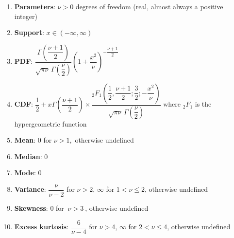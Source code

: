 \begin{enumerate}
    \item \textbf{Parameters}: ${\displaystyle \nu >0}$ degrees of freedom (real, almost always a positive integer)
    \hfill \cite{wiki/Students_t-distribution}

    \item \textbf{Support}: $  {\displaystyle x\in (-\infty ,\infty )} $
    \hfill \cite{wiki/Students_t-distribution}

    \item \textbf{PDF}: $  {\displaystyle {\dfrac {\Gamma {\left({\dfrac {\nu +1}{2}}\right)}}{{\sqrt {\pi \nu }}\,\Gamma {\left({\dfrac {\nu }{2}}\right)}}}\left(1+{\dfrac {x^{2}}{\nu }}\right)^{-{\dfrac {\nu +1}{2}}}} $
    \hfill \cite{wiki/Students_t-distribution}

    \item \textbf{CDF}:  ${\displaystyle {\dfrac {1}{2}}+x\Gamma {\left({\dfrac {\nu +1}{2}}\right)}\times {\dfrac {{}_{2}F_{1}\!\left({\dfrac {1}{2}},{\dfrac {\nu +1}{2}};{\dfrac {3}{2}};-{\dfrac {x^{2}}{\nu }}\right)}{{\sqrt {\pi \nu }}\,\Gamma {\left({\dfrac {\nu }{2}}\right)}}}}$
    where ${\displaystyle {}_{2}F_{1}}$ is the hypergeometric function
    \hfill \cite{wiki/Students_t-distribution}


    \item \textbf{Mean}:  ${\displaystyle 0}$ for ${\displaystyle \nu >1,}$ otherwise undefined
    \hfill \cite{wiki/Students_t-distribution}

    \item \textbf{Median}: $ 0 $
    \hfill \cite{wiki/Students_t-distribution}

    \item \textbf{Mode}: $ 0 $
    \hfill \cite{wiki/Students_t-distribution}

    \item \textbf{Variance}:  ${\displaystyle {\dfrac {\nu }{\nu -2}}}$ for ${\displaystyle \nu >2}$, ${\displaystyle \infty }$ for ${\displaystyle 1<\nu \leq 2}$, otherwise undefined
    \hfill \cite{wiki/Students_t-distribution}

    \item \textbf{Skewness}:  ${\displaystyle 0}$ for ${\displaystyle \ \nu >3\ }$, otherwise undefined
    \hfill \cite{wiki/Students_t-distribution}

    \item \textbf{Excess kurtosis}:  ${\displaystyle {\dfrac {6}{\nu -4}}}$ for ${\displaystyle \nu >4}$, ${\displaystyle \infty }$ for ${\displaystyle 2<\nu \leq 4}$, otherwise undefined
    \hfill \cite{wiki/Students_t-distribution}


\end{enumerate}
